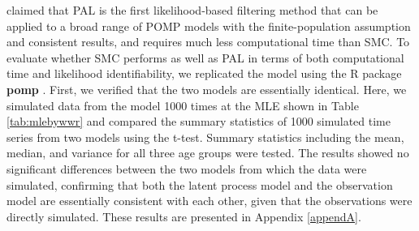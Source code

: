 \documentclass[10pt]{article}
\begin{document}
\cite{wwr} claimed that PAL is the first likelihood-based filtering method that can be applied to a broad range of POMP models with the finite-population assumption and consistent results, and requires much less computational time than SMC. To evaluate whether SMC performs as well as PAL in terms of both computational time and likelihood identifiability, we replicated the model using the R package \textbf{pomp} \citep{pomppackagepaper}. First, we verified that the two models are essentially identical. Here, we simulated data from the model 1000 times at the MLE shown in Table \ref{tab:mlebywwr} and compared the summary statistics of 1000 simulated time series from two models using the t-test. Summary statistics including the mean, median, and variance for all three age groups were tested. The results showed no significant differences between the two models from which the data were simulated, confirming that both the latent process model and the observation model are essentially consistent with each other, given that the observations were directly simulated. These results are presented in Appendix \ref{appendA}.
\end{document}

